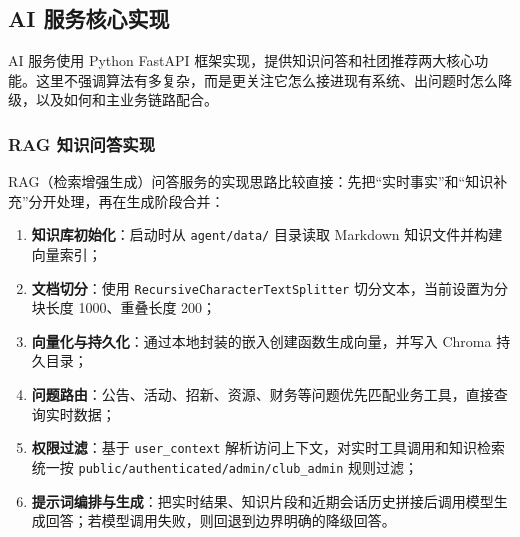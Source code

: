 \subsection{AI 服务核心实现}

AI 服务使用 Python FastAPI 框架实现，提供知识问答和社团推荐两大核心功能。这里不强调算法有多复杂，而是更关注它怎么接进现有系统、出问题时怎么降级，以及如何和主业务链路配合。

\subsubsection{RAG 知识问答实现}

RAG（检索增强生成）问答服务的实现思路比较直接：先把“实时事实”和“知识补充”分开处理，再在生成阶段合并：

\begin{enumerate}
  \item \textbf{知识库初始化}：启动时从 \texttt{agent/data/} 目录读取 Markdown 知识文件并构建向量索引；
  \item \textbf{文档切分}：使用 \texttt{RecursiveCharacterTextSplitter} 切分文本，当前设置为分块长度 1000、重叠长度 200；
  \item \textbf{向量化与持久化}：通过本地封装的嵌入创建函数生成向量，并写入 Chroma 持久目录；
  \item \textbf{问题路由}：公告、活动、招新、资源、财务等问题优先匹配业务工具，直接查询实时数据；
  \item \textbf{权限过滤}：基于 \texttt{user\_context} 解析访问上下文，对实时工具调用和知识检索统一按 \texttt{public/authenticated/admin/club\_admin} 规则过滤；
  \item \textbf{提示词编排与生成}：把实时结果、知识片段和近期会话历史拼接后调用模型生成回答；若模型调用失败，则回退到边界明确的降级回答。
\end{enumerate}

